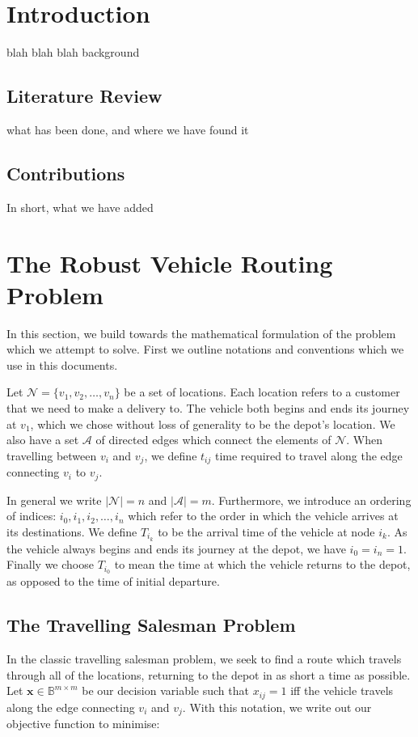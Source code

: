 \section{Introduction}
blah blah blah background
\subsection{Literature Review}
what has been done, and where we have found it
\subsection{Contributions}
In short, what we have added
\section{The Robust Vehicle Routing Problem}
In this section, we build towards the mathematical formulation of the problem which we attempt to solve. First we outline notations and conventions which we use in this documents. 

Let $\mathcal{N} = \{v_1, v_2, \ldots, v_n\}$ be a set of locations. Each location refers to a customer that we need to make a delivery to. The vehicle both begins and ends its journey at $v_1$, which we chose without loss of generality to be the depot's location. We also have a set $\mathcal{A}$ of directed edges which connect the elements of $\mathcal{N}$. When travelling between $v_i$ and $v_j$, we define $t_{ij}$ time required to travel along the edge connecting $v_i$ to $v_j$. 

In general we write $|\mathcal{N}| = n$ and $|\mathcal{A}| = m$. Furthermore, we introduce an ordering of indices: $i_0, i_1, i_2, \ldots, i_n$ which refer to the order in which the vehicle arrives at its destinations. We define $T_{i_k}$ to be the arrival time of the vehicle at node $i_k$. As the vehicle always begins and ends its journey at the depot, we have $i_0 = i_n = 1$. Finally we choose $T_{i_0} $ to mean the time at which the vehicle returns to the depot, as opposed to the time of initial departure.

\subsection{The Travelling Salesman Problem}
In the classic travelling salesman problem, we seek to find a route which travels through all of the locations, returning to the depot in as short a time as possible. Let $\mathbf{x} \in \mathbb{B}^{m\times m}$ be our decision variable such that $x_{ij}=1$ iff the vehicle travels along the edge connecting $v_i$ and $v_j$. With this notation, we write out our objective function to minimise:

